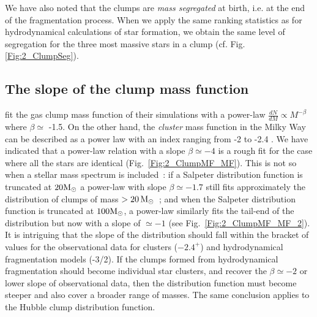 We have also noted that the clumps are {\it mass segregated} at birth, i.e. at the end of the fragmentation process. When we apply the same ranking statistics as for hydrodynamical calculations of star formation, we obtain the same level of segregation for the three most massive stars in a clump (cf. Fig. \ref{Fig:2_ClumpSeg}). %

\subsection*{The slope of the clump mass function}

\cite{Klessen2000,Klessen2001} fit the gas clump mass function of their simulations with a power-law $\frac{dN}{dM} \propto M^{-\beta}$ where $\beta \simeq$ -1.5. On the other hand, the \textit{cluster} mass function in the Milky Way can be described as a power law with an index ranging from -2 to -2.4 \citep{Haas2010}. We have indicated that a power-law relation with a slope $ \beta \simeq -4$ is a rough fit for the case where all the stars are identical (Fig.~\ref{Fig:2_ClumpMF_MF}). This is not so  when a stellar mass spectrum is included~: if a Salpeter distribution function is truncated at $20 {\textrm{M}_\odot}$ a power-law with slope $ \beta \simeq -1.7$ still fits approximately the distribution of clumps of  mass $ > 20\, {\textrm{M}_\odot}$~; and when the Salpeter distribution function is truncated at $100 {\textrm{M}_\odot}$, a power-law similarly fits the tail-end of the distribution but now with a slope of $\simeq -1$ (see Fig.~\ref{Fig:2_ClumpMF_MF_2}). It is intriguing that the slope of the distribution should fall within the bracket of values for the observational data for clusters ($-2.4^+$) and hydrodynamical fragmentation models (-3/2). If the clumps formed from hydrodynamical fragmentation should become individual star clusters, and recover the $\beta \simeq -2 $ or lower slope of observational data, then the distribution function must become steeper and also cover a broader range of masses. The same conclusion applies to the Hubble clump distribution function.

